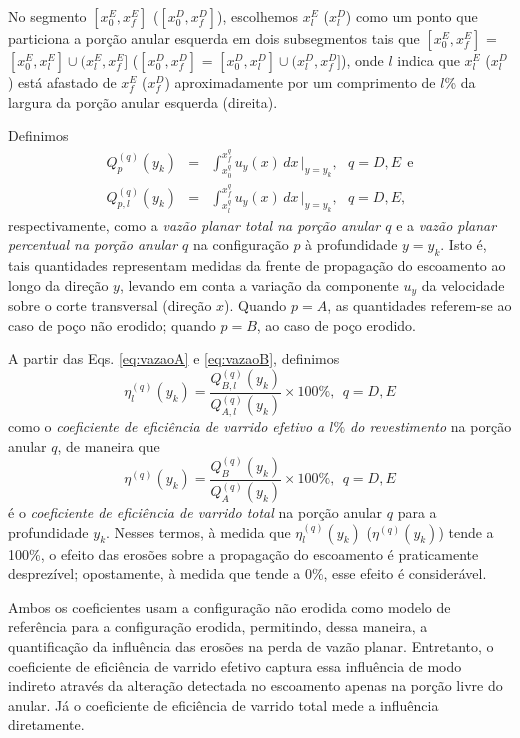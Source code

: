 No segmento $[x_0^E,x_f^E]$ ($[x_0^D,x_f^D]$), escolhemos $x_l^E$ ($x_l^D$) como um ponto que particiona a porção anular esquerda em dois subsegmentos
tais que $[x_0^E,x_f^E]$ = $[x_0^E,x_l^E] \cup (x_l^E,x_f^E]$ ($[x_0^D,x_f^D]$ = $[x_0^D,x_l^D] \cup (x_l^D,x_f^D]$), onde $l$ indica que $x_l^E$ ($x_l^D$) está afastado de
$x_f^E$ ($x_f^D$) aproximadamente por um comprimento de $l$\% da largura da porção anular esquerda (direita).

Definimos
\begin{eqnarray}
    Q_p^{(q)}(y_k) &=& \int_{x_0^q}^{x_f^q} u_y(x) \, dx \, \Bigg|_{y = y_k}, \ \ \ q = D,E \ \ \text{e} \label{eq:vazaoA}\\
    Q_{p,l}^{(q)}(y_k) &=& \int_{x_l^q}^{x_f^q} u_y(x) \, dx \, \Bigg|_{y = y_k}, \ \ \ q = D,E, \label{eq:vazaoB}
\end{eqnarray}
respectivamente, como a \emph{vazão planar total na porção anular $q$} e a \emph{vazão planar percentual na porção anular $q$} na configuração $p$ à profundidade $y = y_k$. Isto é, tais quantidades representam medidas da frente de propagação do escoamento ao longo da direção $y$, levando em conta a variação da componente $u_y$ da velocidade sobre o corte transversal (direção $x$). Quando $p = A$, as quantidades referem-se ao caso de poço não erodido; quando $p = B$, ao caso de poço erodido.

A partir das Eqs. \eqref{eq:vazaoA} e \eqref{eq:vazaoB}, definimos
\begin{equation}
    \eta_l^{(q)}(y_k) = \dfrac{Q_{B,l}^{(q)}(y_k)}{Q_{A,l}^{(q)}(y_k)} \times 100\%, \ \ q = D,E
\end{equation}
como o \emph{coeficiente de eficiência de varrido efetivo a $l\%$ do revestimento} na porção anular $q$, de maneira que
\begin{equation}
    \eta^{(q)}(y_k) = \dfrac{Q_{B}^{(q)}(y_k)}{Q_{A}^{(q)}(y_k)} \times 100\%, \ \ q = D,E
\end{equation}
é o \emph{coeficiente de eficiência de varrido total} na porção anular $q$ para a profundidade $y_k$. Nesses termos, à medida que $\eta_l^{(q)}(y_k)$ ($\eta^{(q)}(y_k)$) tende a 100\%, o efeito das erosões sobre a propagação do escoamento é praticamente desprezível; opostamente, à medida que tende a 0\%, esse efeito é considerável.

Ambos os coeficientes usam a configuração não erodida como modelo de referência para a configuração erodida, permitindo, dessa maneira, a quantificação da influência das erosões na perda de vazão planar. Entretanto, o coeficiente de eficiência de varrido efetivo captura essa influência de modo indireto através da alteração detectada no escoamento apenas na porção livre do anular. Já o coeficiente de eficiência de varrido total mede a influência diretamente.


